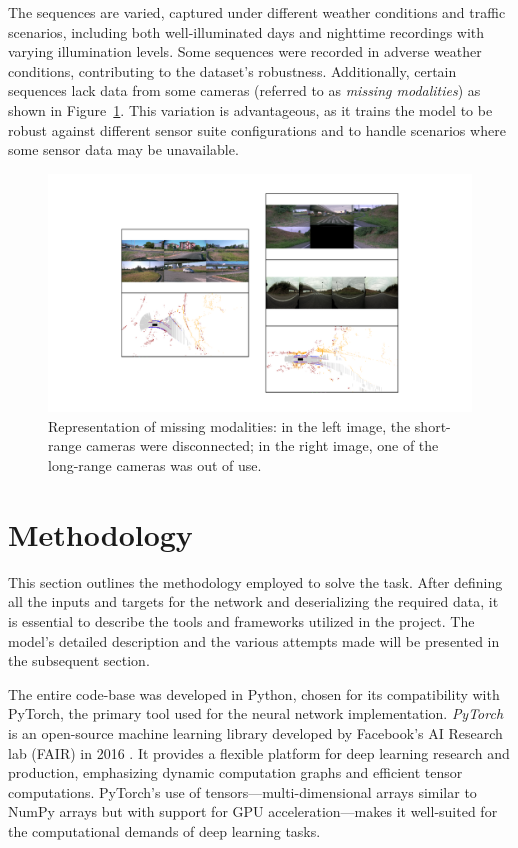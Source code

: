 The sequences are varied, captured under different weather conditions and traffic scenarios, including both well-illuminated days and nighttime recordings with varying illumination levels. Some sequences were recorded in adverse weather conditions, contributing to the dataset's robustness. Additionally, certain sequences lack data from some cameras (referred to as \textit{missing modalities}) as shown in Figure~\ref{fig:missing_modalities}. This variation is advantageous, as it trains the model to be robust against different sensor suite configurations and to handle scenarios where some sensor data may be unavailable.
\begin{figure}
    \centering
    \includegraphics[width=0.9\linewidth]{LateX//figs/missing_modalities.pdf}
    \caption{Representation of missing modalities: in the left image, the short-range cameras were disconnected; in the right image, one of the long-range cameras was out of use.}
    \label{fig:missing_modalities}
\end{figure}
\section{Methodology}

This section outlines the methodology employed to solve the task. After defining all the inputs and targets for the network and deserializing the required data, it is essential to describe the tools and frameworks utilized in the project. The model's detailed description and the various attempts made will be presented in the subsequent section.

The entire code-base was developed in Python, chosen for its compatibility with PyTorch, the primary tool used for the neural network implementation. \textit{PyTorch} is an open-source machine learning library developed by Facebook's AI Research lab (FAIR) in 2016 \cite{NEURIPS2019_9015}. It provides a flexible platform for deep learning research and production, emphasizing dynamic computation graphs and efficient tensor computations. PyTorch's use of tensors—multi-dimensional arrays similar to NumPy \cite{harris2020array} arrays but with support for GPU acceleration—makes it well-suited for the computational demands of deep learning tasks.

